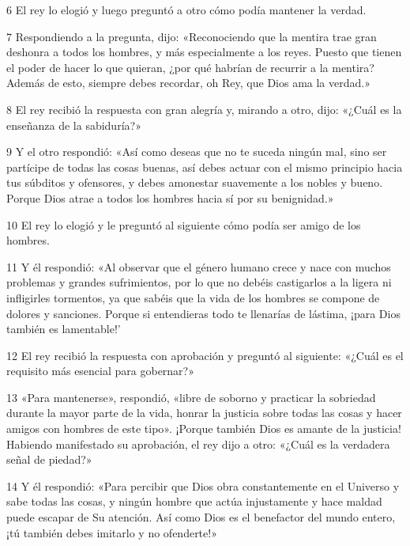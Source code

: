\par 6 El rey lo elogió y luego preguntó a otro cómo podía mantener la verdad.

\par 7 Respondiendo a la pregunta, dijo: «Reconociendo que la mentira trae gran deshonra a todos los hombres, y más especialmente a los reyes. Puesto que tienen el poder de hacer lo que quieran, ¿por qué habrían de recurrir a la mentira? Además de esto, siempre debes recordar, oh Rey, que Dios ama la verdad.»

\par 8 El rey recibió la respuesta con gran alegría y, mirando a otro, dijo: «¿Cuál es la enseñanza de la sabiduría?»

\par 9 Y el otro respondió: «Así como deseas que no te suceda ningún mal, sino ser partícipe de todas las cosas buenas, así debes actuar con el mismo principio hacia tus súbditos y ofensores, y debes amonestar suavemente a los nobles y bueno. Porque Dios atrae a todos los hombres hacia sí por su benignidad.»

\par 10 El rey lo elogió y le preguntó al siguiente cómo podía ser amigo de los hombres.

\par 11 Y él respondió: «Al observar que el género humano crece y nace con muchos problemas y grandes sufrimientos, por lo que no debéis castigarlos a la ligera ni infligirles tormentos, ya que sabéis que la vida de los hombres se compone de dolores y sanciones. Porque si entendieras todo te llenarías de lástima, ¡para Dios también es lamentable!'

\par 12 El rey recibió la respuesta con aprobación y preguntó al siguiente: «¿Cuál es el requisito más esencial para gobernar?»

\par 13 «Para mantenerse», respondió, «libre de soborno y practicar la sobriedad durante la mayor parte de la vida, honrar la justicia sobre todas las cosas y hacer amigos con hombres de este tipo». ¡Porque también Dios es amante de la justicia! Habiendo manifestado su aprobación, el rey dijo a otro: «¿Cuál es la verdadera señal de piedad?»

\par 14 Y él respondió: «Para percibir que Dios obra constantemente en el Universo y sabe todas las cosas, y ningún hombre que actúa injustamente y hace maldad puede escapar de Su atención. Así como Dios es el benefactor del mundo entero, ¡tú también debes imitarlo y no ofenderte!»

